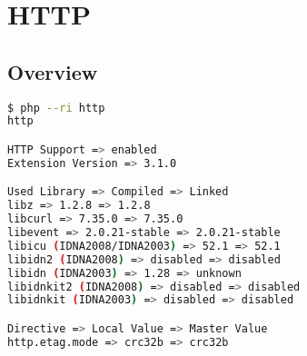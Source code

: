 \part{HTTP}

\chapter{Overview}


\begin{lstlisting}[language=bash]
$ php --ri http
http

HTTP Support => enabled
Extension Version => 3.1.0

Used Library => Compiled => Linked
libz => 1.2.8 => 1.2.8
libcurl => 7.35.0 => 7.35.0
libevent => 2.0.21-stable => 2.0.21-stable
libicu (IDNA2008/IDNA2003) => 52.1 => 52.1
libidn2 (IDNA2008) => disabled => disabled
libidn (IDNA2003) => 1.28 => unknown
libidnkit2 (IDNA2008) => disabled => disabled
libidnkit (IDNA2003) => disabled => disabled

Directive => Local Value => Master Value
http.etag.mode => crc32b => crc32b
\end{lstlisting}